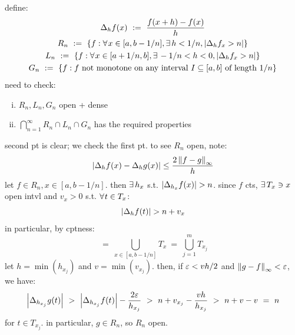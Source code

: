 \begin{pf}[source=Primary Source Material]
	define:
	\begin{gather*}
		\Delta_{h}f(x) \ := \ \frac{f(x+h)-f(x)}{h} \\
		R_{n} \ := \ \set{f:\fa x\in[a,b-1/n],\ex h<1/n,\abs{\Delta_{h}f_{x}>n}} \\
		L_{n} \ := \ \set{f:\fa x\in[a+1/n,b],\ex -1/n<h<0,\abs{\Delta_{h}f_{x}>n}} \\
		G_{n} \ := \ \set{f: f \trm{ not monotone on any interval } I\subseteq[a,b] \trm{ of length } 1/n}
	\end{gather*}
	need to check:
	\begin{enumerate}[i)]
		\item $R_{n},L_{n},G_{n}$ open + dense
		\item $\bigcap_{n=1}^{\infty}R_{n}\cap L_{n}\cap G_{n}$ has the required properties
	\end{enumerate}
	second pt is clear; we check the first pt.
	to see $R_{n}$ open, note:
	\begin{equation*}
		\abs{\Delta_{h}f(x)-\Delta_{h}g(x)}\leq\frac{2\left\|f-g\right\|_{\infty}}{h}
	\end{equation*}
	let $f\in R_{n},x\in[a,b-1/n]$. then $\ex h_{x}$ s.t. $\abs{\Delta_{h_{x}}f(x)}>n$.
	since $f$ cts, $\ex T_{x}\ni x$ open intvl and $v_{x}>0$ s.t. $\fa t\in T_{x}$:
	\begin{equation*}
		\abs{\Delta_{h}f(t)}>n+v_{x}
	\end{equation*}
	in particular, by cptness:
	\begin{equation*}
		[a,b-1/n] \ = \ \bigcup_{x\in[a,b-1/n]}T_{x} \ = \ \bigcup_{j=1}^{m}T_{x_{j}}
	\end{equation*}
	let $h=\min(h_{x_{j}})$ and $v=\min(v_{x_{j}})$.
	then, if $\varepsilon<vh/2$ and $\left\|g-f\right\|_{\infty}<\varepsilon$, we have:
	\begin{equation*}
		\abs{\Delta_{h_{x_{j}}}g(t)} \ > \ \abs{\Delta_{h_{x_{j}}}f(t)}-\frac{2\ep}{h_{x_{j}}}
		\ > \ n+v_{x_{j}}-\frac{vh}{h_{x_{j}}} \ > \ n+v-v \ = \ n
	\end{equation*}
	for $t\in T_{x_{j}}$. in particular, $g\in R_{n}$, so $R_{n}$ open.
\end{pf}


